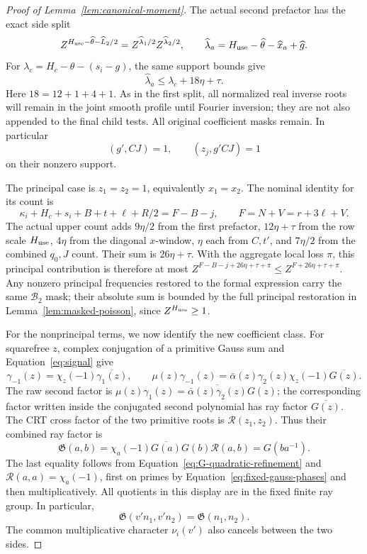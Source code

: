 \documentclass[11pt,a4paper]{article}
\numberwithin{equation}{section}
\numberwithin{figure}{section}
\theoremstyle{definition}
\theoremstyle{remark}
\begin{document}
\begin{proof}[Proof of Lemma~\ref{lem:canonical-moment}]
The actual second prefactor has the exact side split
\[
 Z^{H_{\rm use}-\widehat\theta-\widehat L_2/2}
       =Z^{\widehat\lambda_1/2}Z^{\widehat\lambda_2/2},
 \qquad \widehat\lambda_a=H_{\rm use}-\widehat\theta-\widehat x_a+
                           \widehat g.
\]
For \(\lambda_c=H_c-\theta-(s_i-g)\), the same support bounds give
\begin{equation}\label{eq:inverse-second-prefactor-error}
 \widehat\lambda_a\le\lambda_c+18\eta+\tau.
\end{equation}
Here \(18=12+1+4+1\).  As in the first split, all normalized real
inverse roots will remain in the joint smooth profile until Fourier
inversion; they are not also appended to the final child tests.
All original coefficient masks remain.  In particular
\[
 (g',CJ)=1,\qquad (z_j,g'CJ)=1
\]
on their nonzero support.

The principal case is \(z_1=z_2=1\), equivalently \(x_1=x_2\).
The nominal identity for its count is
\begin{equation}\label{eq:second-principal-exponent}
 \kappa_i+H_c+s_i+B+t+\ell+R/2=F-B-j,
 \qquad F=N+V=r+3\ell+V.
\end{equation}
The actual upper count adds \(9\eta/2\) from the first prefactor,
\(12\eta+\tau\) from the row scale \(H_{\rm use}\), \(4\eta\) from the
diagonal \(x\)-window, \(\eta\) each from \(C,t'\), and \(7\eta/2\) from
the combined \(q_0,J\) count.  Their sum is \(26\eta+\tau\).  With the
aggregate local loss \(\pi\), this principal contribution is therefore
at most \(Z^{F-B-j+26\eta+\tau+\pi}\le Z^{F+26\eta+\tau+\pi}\).
Any nonzero principal frequencies restored to the formal expression carry
the same \(\mathcal B_2\) mask; their absolute sum is bounded by the full
principal restoration in Lemma~\ref{lem:masked-poisson}, since
\(Z^{H_{\rm use}}\ge1\).

For the nonprincipal terms, we now identify the new coefficient
class.  For squarefree \(z\), complex conjugation of a primitive
Gauss sum and Equation~\eqref{eq:signal} give
\[
 \gamma_{-1}(z)=\chi_z(-1)\overline{\gamma_1(z)},\qquad
 \mu(z)\gamma_{-1}(z)
 =\bar\alpha(z)\gamma_2(z)\chi_z(-1)\overline{G(z)}.
\]
The raw second factor is
\(\mu(z)\gamma_1(z)=\overline{\bar\alpha(z)\gamma_2(z)}G(z)\);
the corresponding factor written inside the conjugated second
polynomial has ray factor \(\overline{G(z)}\).  The CRT cross factor of the two primitive
roots is \(\mathcal R(z_1,z_2)\).  Thus their combined ray factor is
\[
 \mathfrak G(a,b)=\chi_a(-1)\overline{G(a)}G(b)\mathcal R(a,b)
       =G(ba^{-1}).
\]
The last equality follows from
Equation~\eqref{eq:G-quadratic-refinement} and
\(\mathcal R(a,a)=\chi_a(-1)\), first on primes by
Equation~\eqref{eq:fixed-gauss-phases} and then multiplicatively.
All quotients in this display are in the fixed finite ray group.
In particular,
\[
 \mathfrak G(v'n_1,v'n_2)=\mathfrak G(n_1,n_2).
\]
The common multiplicative character \(\nu_i(v')\) also cancels
between the two sides.


\end{proof}
\end{document}
